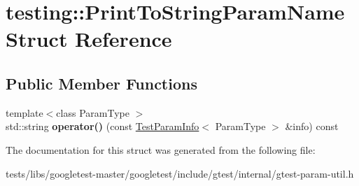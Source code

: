 \hypertarget{structtesting_1_1PrintToStringParamName}{}\section{testing\+:\+:Print\+To\+String\+Param\+Name Struct Reference}
\label{structtesting_1_1PrintToStringParamName}
\subsection*{Public Member Functions}
\begin{DoxyCompactItemize}
\item 
\mbox{\label{structtesting_1_1PrintToStringParamName_a05b411cfb75dadb2c3c0355aee1dcf21}} 
{\footnotesize template$<$class Param\+Type $>$ }\\std\+::string {\bfseries operator()} (const \hyperlink{structtesting_1_1TestParamInfo}{Test\+Param\+Info}$<$ Param\+Type $>$ \&info) const
\end{DoxyCompactItemize}


The documentation for this struct was generated from the following file\+:\begin{DoxyCompactItemize}
\item 
tests/libs/googletest-\/master/googletest/include/gtest/internal/gtest-\/param-\/util.\+h\end{DoxyCompactItemize}
